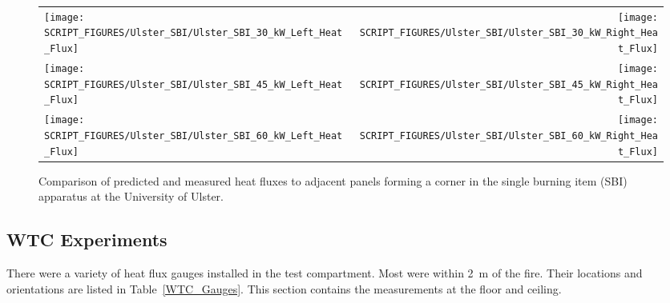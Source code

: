 \begin{figure}[h!]
\begin{tabular*}{\textwidth}{l@{\extracolsep{\fill}}r}
\texttt{[image: SCRIPT\_FIGURES/Ulster\_SBI/Ulster\_SBI\_30\_kW\_Left\_Heat\_Flux]} &
\texttt{[image: SCRIPT\_FIGURES/Ulster\_SBI/Ulster\_SBI\_30\_kW\_Right\_Heat\_Flux]} \\
\texttt{[image: SCRIPT\_FIGURES/Ulster\_SBI/Ulster\_SBI\_45\_kW\_Left\_Heat\_Flux]} &
\texttt{[image: SCRIPT\_FIGURES/Ulster\_SBI/Ulster\_SBI\_45\_kW\_Right\_Heat\_Flux]} \\
\texttt{[image: SCRIPT\_FIGURES/Ulster\_SBI/Ulster\_SBI\_60\_kW\_Left\_Heat\_Flux]} &
\texttt{[image: SCRIPT\_FIGURES/Ulster\_SBI/Ulster\_SBI\_60\_kW\_Right\_Heat\_Flux]}
\end{tabular*}
\label{Ulster_SBI}
\caption[Corner heat flux predictions, Ulster SBI experiments]
{Comparison of predicted and measured heat fluxes to adjacent panels forming a corner in the single
burning item (SBI) apparatus at the University of Ulster.}
\end{figure}

\clearpage


\subsection{WTC Experiments}

There were a variety of heat flux gauges installed in the test compartment. Most were within 2~m of the fire. Their locations and orientations are listed in Table~\ref{WTC_Gauges}. This section contains the measurements at the floor and ceiling.

